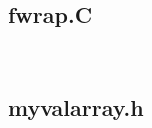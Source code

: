 \subsection{fwrap.C}

\texttt{
\sloppy
\small
}

\subsection{myvalarray.h}

\texttt{
\sloppy
\small
}
